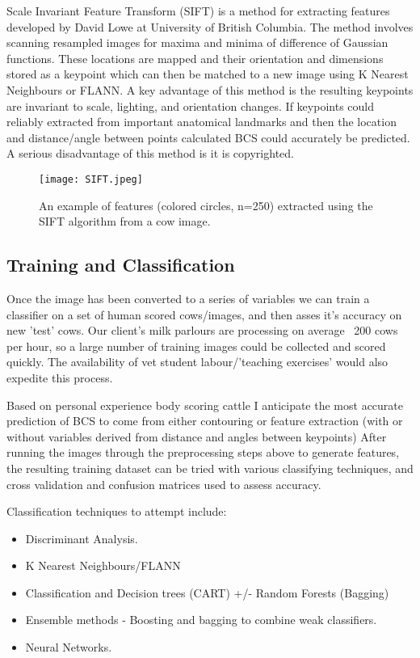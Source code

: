 \documentclass[11pt]{article}
\begin{document}
	
	Scale Invariant Feature Transform (SIFT) is a method for extracting features developed by David Lowe at University of British Columbia\cite{Lowe2004a}.
	The method involves scanning resampled images for maxima and minima of difference of Gaussian functions.
	These locations are mapped and their orientation and dimensions stored as a keypoint which can then be matched to a new image using K Nearest Neighbours or FLANN. 
	A key advantage of this method is the resulting keypoints are invariant to scale, lighting, and orientation changes.
	If keypoints could reliably extracted from important anatomical landmarks and then the location and distance/angle between points calculated BCS could accurately be predicted.
	A serious disadvantage of this method is it is copyrighted.

	\begin{figure}[b!]
		\centering
		\texttt{[image: SIFT.jpeg]}
		\caption{An example of features (colored circles, n=250) extracted  using the SIFT algorithm from a cow image.}
	\end{figure}


\subsection{Training and Classification}
	Once the image has been converted to a series of variables we can train a classifier on a set of human scored cows/images, and then asses it's accuracy on new 'test' cows.
	Our client's milk parlours are processing on average ~200 cows per hour, so a large number of training images could be collected and scored quickly. 
	The availability of vet student labour/'teaching exercises' would also expedite this process.


	Based on personal experience body scoring cattle I anticipate the most accurate prediction of BCS to come from either contouring or feature extraction (with or without variables derived from distance and angles between keypoints)
	After running the images through the preprocessing steps above to generate features, the resulting training dataset can be tried with various classifying techniques, and cross validation and confusion matrices used to assess accuracy.


	Classification techniques to attempt include: 

	\begin{itemize}
		\item Discriminant Analysis.
		\item K Nearest Neighbours/FLANN
		\item Classification and Decision trees (CART) +/- Random Forests (Bagging)
		\item Ensemble methods - Boosting and bagging to combine weak classifiers. 
		\item Neural Networks. 
	\end{itemize}
\end{document}
